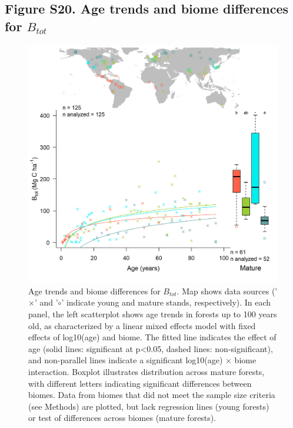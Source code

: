 \documentclass[
]{article}
\begin{document}
\newpage

\hypertarget{figure-s20.-age-trends-and-biome-differences-for-b_tot}{%
\subsection{\texorpdfstring{Figure S20. Age trends and biome differences
for
\(B_{tot}\)}{Figure S20. Age trends and biome differences for B\_\{tot\}}}\label{figure-s20.-age-trends-and-biome-differences-for-b_tot}}

\begin{figure}[H]

{\centering \includegraphics[width=1\linewidth]{tables_figures/age_trends/biomass_with_map} 

}

\caption{Age trends and biome differences for $B_{tot}$. Map shows data sources ('$\times$' and '$\circ$' indicate young and mature stands, respectively). In each panel, the left scatterplot shows age trends in forests up to 100 years old, as characterized by a linear mixed effects model with fixed effects of log10(age) and biome. The fitted line indicates the effect of age (solid lines: significant at p<0.05, dashed lines: non-significant), and non-parallel lines indicate a significant log10(age) $\times$ biome interaction. Boxplot illustrates distribution across mature forests, with different letters indicating significant differences between biomes. Data from biomes that did not meet the sample size criteria (see Methods) are plotted, but lack regression lines (young forests) or test of differences across biomes (mature forests).}\label{fig:unnamed-chunk-23}
\end{figure}
\end{document}
